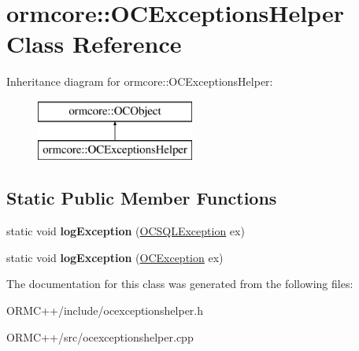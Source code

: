 \hypertarget{classormcore_1_1_o_c_exceptions_helper}{
\section{ormcore\-:\-:\-O\-C\-Exceptions\-Helper \-Class \-Reference}
\label{classormcore_1_1_o_c_exceptions_helper}
}
\-Inheritance diagram for ormcore\-:\-:\-O\-C\-Exceptions\-Helper\-:\begin{figure}[H]
\begin{center}
\leavevmode
\includegraphics[height=2.000000cm]{classormcore_1_1_o_c_exceptions_helper}
\end{center}
\end{figure}
\subsection*{\-Static \-Public \-Member \-Functions}
\begin{DoxyCompactItemize}
\item 
\hypertarget{classormcore_1_1_o_c_exceptions_helper_ac2c0bc3e1b609386791e0f8a7ce60799}{
static void {\bfseries log\-Exception} (\hyperlink{classormcore_1_1_o_c_s_q_l_exception}{\-O\-C\-S\-Q\-L\-Exception} ex)}
\label{classormcore_1_1_o_c_exceptions_helper_ac2c0bc3e1b609386791e0f8a7ce60799}

\item 
\hypertarget{classormcore_1_1_o_c_exceptions_helper_ad41b6c1cfa856133701562c004a222ff}{
static void {\bfseries log\-Exception} (\hyperlink{classormcore_1_1_o_c_exception}{\-O\-C\-Exception} ex)}
\label{classormcore_1_1_o_c_exceptions_helper_ad41b6c1cfa856133701562c004a222ff}

\end{DoxyCompactItemize}


\-The documentation for this class was generated from the following files\-:\begin{DoxyCompactItemize}
\item 
\-O\-R\-M\-C++/include/ocexceptionshelper.\-h\item 
\-O\-R\-M\-C++/src/ocexceptionshelper.\-cpp\end{DoxyCompactItemize}
